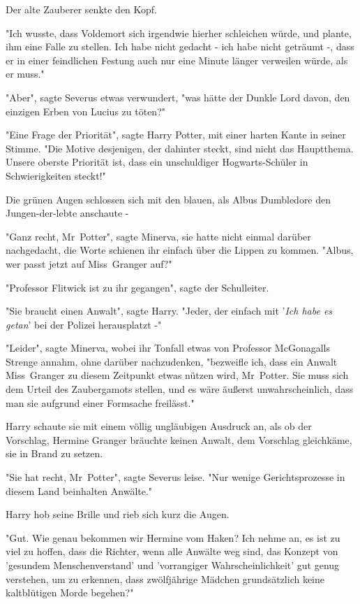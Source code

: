 {Der alte Zauberer senkte den Kopf.

"Ich wusste, dass Voldemort sich irgendwie hierher schleichen würde, und plante, ihm eine Falle zu stellen. Ich habe nicht gedacht - ich habe nicht geträumt -, dass er in einer feindlichen Festung auch nur eine Minute länger verweilen würde, als er muss."

"Aber", sagte Severus etwas verwundert, "was hätte der Dunkle Lord davon, den einzigen Erben von Lucius zu töten?"

"Eine Frage der Priorität", sagte Harry Potter, mit einer harten Kante in seiner Stimme. "Die Motive desjenigen, der dahinter steckt, sind nicht das Hauptthema. Unsere oberste Priorität ist, dass ein unschuldiger Hogwarts-Schüler in Schwierigkeiten steckt!"

Die grünen Augen schlossen sich mit den blauen, als Albus Dumbledore den Jungen-der-lebte anschaute -

"Ganz recht, Mr~Potter", sagte Minerva, sie hatte nicht einmal darüber nachgedacht, die Worte schienen ihr einfach über die Lippen zu kommen. "Albus, wer passt jetzt auf Miss~Granger auf?"

"Professor Flitwick ist zu ihr gegangen", sagte der Schulleiter.

"Sie braucht einen Anwalt", sagte Harry. "Jeder, der einfach mit '\emph{Ich habe es getan}' bei der Polizei herausplatzt -"

"Leider", sagte Minerva, wobei ihr Tonfall etwas von Professor McGonagalls Strenge annahm, ohne darüber nachzudenken, "bezweifle ich, dass ein Anwalt Miss~Granger zu diesem Zeitpunkt etwas nützen wird, Mr~Potter. Sie muss sich dem Urteil des Zaubergamots stellen, und es wäre äußerst unwahrscheinlich, dass man sie aufgrund einer Formsache freilässt."

Harry schaute sie mit einem völlig ungläubigen Ausdruck an, als ob der Vorschlag, Hermine Granger bräuchte keinen Anwalt, dem Vorschlag gleichkäme, sie in Brand zu setzen.

"Sie hat recht, Mr~Potter", sagte Severus leise. "Nur wenige Gerichtsprozesse in diesem Land beinhalten Anwälte."

Harry hob seine Brille und rieb sich kurz die Augen.

"Gut. Wie genau bekommen wir Hermine vom Haken? Ich nehme an, es ist zu viel zu hoffen, dass die Richter, wenn alle Anwälte weg sind, das Konzept von 'gesundem Menschenverstand' und 'vorrangiger Wahrscheinlichkeit' gut genug verstehen, um zu erkennen, dass zwölfjährige Mädchen grundsätzlich keine kaltblütigen Morde begehen?"

}
